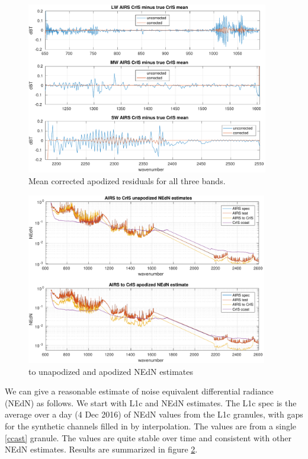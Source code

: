 \documentclass[11pt]{article}
\begin{document}
\begin{figure} %
  \centering
  \includegraphics[height=7.5cm]{figures/a2cris_regr_all.pdf}
  \caption{Mean corrected apodized residuals for all three bands.}
  \label{statall}
\end{figure}

\begin{figure} %
  \centering
  \includegraphics[height=7.5cm]{figures/a2cris_nedn.pdf}
  \caption{{\airs} to {\cris} unapodized and apodized NEdN
    estimates}
  \label{nedn}
\end{figure}

We can give a reasonable estimate of noise equivalent differential
radiance (NEdN) as follows.  We start with {\airs} L1c and {\cris}
NEdN estimates.  The L1c spec is the average over a day (4 Dec 2016)
of NEdN values from the L1c granules, with gaps for the synthetic
channels filled in by interpolation.  The {\cris} values are from a
single {\ccast} \ref{ccast} granule.  The {\cris} values are quite
stable over time and consistent with other {\cris} NEdN estimates.
Results are summarized in figure \ref{nedn}.
\end{document}
